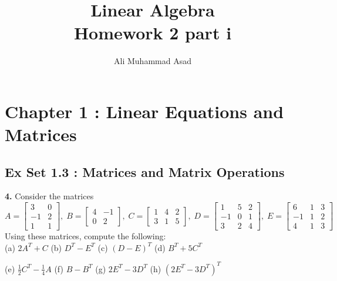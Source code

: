 \documentclass[addpoints]{exam}
\title{Linear Algebra\\ Homework 2 part i}
\author{Ali Muhammad Asad}
\begin{document}
\maketitle
\begin{sloppypar}
\section*{\textbf{Chapter 1 : Linear Equations and Matrices}}

\subsection*{\textbf{Ex Set 1.3 : Matrices and Matrix Operations}}

\begin{questions}
    \question
    \textbf{4. } Consider the matrices
    $$ A = \begin{bmatrix}
        3 & 0 \\ -1 & 2 \\ 1 & 1
    \end{bmatrix},\; B = \begin{bmatrix}
        4 & -1 \\ 0 & 2
    \end{bmatrix},\; C = \begin{bmatrix}
        1 & 4 & 2 \\ 3 & 1 & 5
    \end{bmatrix},\; D = \begin{bmatrix}
        1 & 5 & 2 \\ -1 &  0 & 1 \\ 3 & 2 & 4
    \end{bmatrix},\; E = \begin{bmatrix}
        6 & 1 & 3 \\ -1 & 1 & 2 \\ 4 & 1 & 3
    \end{bmatrix} $$
    Using these matrices, compute the following: \\ 
    (a) $ 2A^T + C $ \hspace{10mm} (b) $ D^T - E^T $ \hspace{10mm} (c) $ (D - E)^T $ \hspace{10mm} (d) $ B^T + 5C^T $
    
    \vspace{2mm} (e) $ \frac{1}{2}C^T - \frac{1}{4}A $ \hspace{7.5mm} (f) $ B - B^T $ \hspace{13mm} (g) $ 2E^T - 3D^T $  \hspace{7mm} (h) $ (2E^T - 3D^T)^T $
    \begin{solution}


\end{solution}
\end{questions}
\end{sloppypar}
\end{document}
